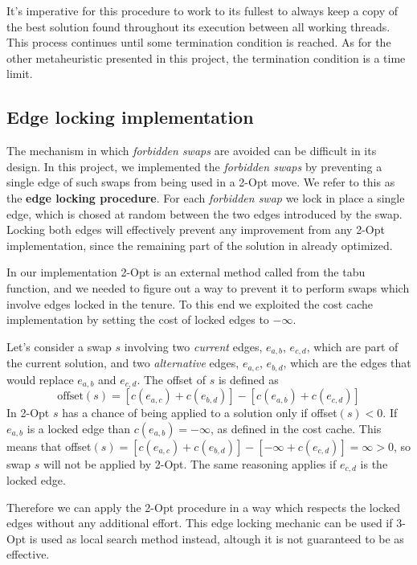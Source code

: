 It's imperative for this procedure to work to its fullest to always keep a copy of the best solution found throughout its execution between all working threads.
This process continues until some termination condition is reached.
As for the other metaheuristic presented in this project, the termination condition is a time limit.

\subsection{Edge locking implementation}

The mechanism in which \textit{forbidden swaps} are avoided can be difficult in its design.
In this project, we implemented the \textit{forbidden swaps} by preventing a single edge of such swaps from being used in a 2-Opt move.
We refer to this as the \textbf{edge locking procedure}.
For each \textit{forbidden swap} we lock in place a single edge, which is chosed at random between the two edges introduced by the swap.
Locking both edges will effectively prevent any improvement from any 2-Opt implementation, since the remaining part of the solution in already optimized.

In our implementation 2-Opt is an external method called from the tabu function, and we needed to figure out a way to prevent it to perform swaps which involve edges locked in the tenure.
To this end we exploited the cost cache implementation by setting the cost of locked edges to $-\infty$.

Let's consider a swap $s$ involving two \textit{current} edges, $e_{a,b}$, $e_{c,d}$, which are part of the current solution, and two \textit{alternative} edges, $e_{a,c}$, $e_{b,d}$, which are the edges that would replace $e_{a,b}$ and $e_{c,d}$.
The offset of $s$ is defined as
\[
    \text{offset}(s) = [c(e_{a,c}) + c(e_{b,d})] - [c(e_{a,b}) + c(e_{c,d})]
\]
In 2-Opt $s$ has a chance of being applied to a solution only if offset$(s)<0$.
If $e_{a,b}$ is a locked edge than $c(e_{a,b})=-\infty$, as defined in the cost cache.
This means that offset$(s) = [c(e_{a,c}) + c(e_{b,d})] - [-\infty + c(e_{c,d})] = \infty > 0$, so swap $s$ will not be applied by 2-Opt.
The same reasoning applies if $e_{c,d}$ is the locked edge.

Therefore we can apply the 2-Opt procedure in a way which respects the locked edges without any additional effort.
This edge locking mechanic can be used if 3-Opt is used as local search method instead, altough it is not guaranteed to be as effective.

